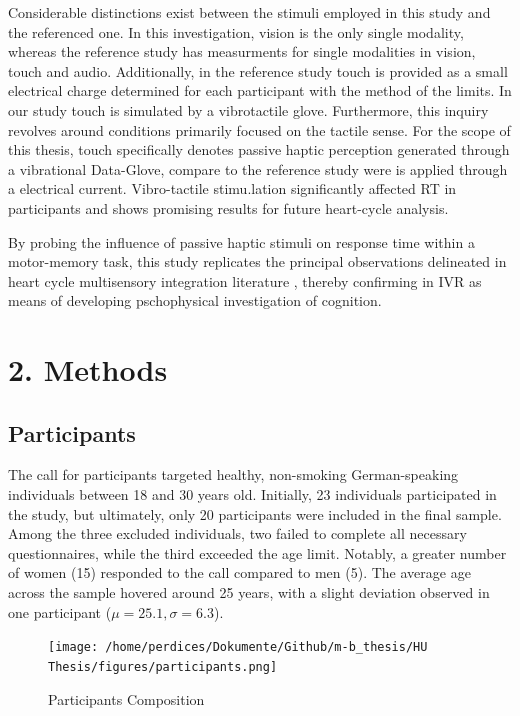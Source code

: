 \documentclass[12pt,oneside,openright]{report}
\begin{document}
Considerable distinctions exist between the stimuli employed in this study and the referenced one. In this investigation, vision is the only single modality, whereas the reference study has measurments for single modalities in vision, touch and audio. Additionally, in the reference study touch is provided as a small electrical charge determined for each participant with the method of the limits. In our study touch is simulated by a vibrotactile glove. Furthermore, this inquiry revolves around conditions primarily focused on the tactile sense. For the scope of this thesis, touch specifically denotes passive haptic perception generated through a vibrational Data-Glove, compare to the reference study were is applied through a electrical current. Vibro-tactile stimu.lation significantly affected RT in participants and shows promising results for future heart-cycle analysis.

By probing the influence of passive haptic stimuli on response time within a motor-memory task, this study replicates the principal observations delineated in heart cycle multisensory integration literature \parencite{SALTAFOSSI2023108642}, thereby confirming in IVR as means of developing pschophysical investigation of cognition.


\section*{2. Methods}
\subsection*{Participants}
The call for participants targeted healthy, non-smoking German-speaking individuals between 18 and 30 years old. Initially, 23 individuals participated in the study, but ultimately, only 20 participants were included in the final sample. Among the three excluded individuals, two failed to complete all necessary questionnaires, while the third exceeded the age limit. Notably, a greater number of women (15) responded to the call compared to men (5). The average age across the sample hovered around 25 years, with a slight deviation observed in one participant ($\mu=25.1, \sigma=6.3$).

\begin{figure}[h]
    \centering
    \texttt{[image: /home/perdices/Dokumente/Github/m-b\_thesis/HU Thesis/figures/participants.png]}
    \caption{Participants Composition}
    \label{fig:mesh1}
\end{figure}
\end{document}
